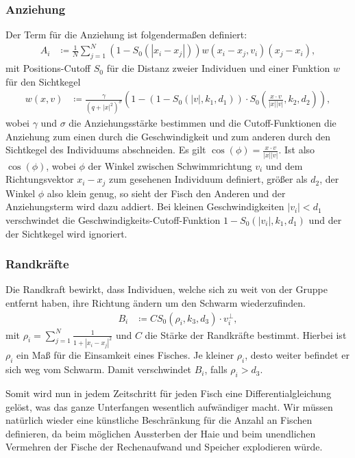 \documentclass[a4paper,11pt]{article}
\theoremstyle{definition}
\numberwithin{equation}{section}
\begin{document}
	\subsubsection{Anziehung}
	Der Term für die Anziehung ist folgendermaßen definiert:
	\begin{align*}
		A_i &\coloneqq \frac{1}{N}\sum^N_{j = 1} (1-S_0(|x_i - x_j|))w(x_i - x_j, v_i)(x_j - x_i), 
	\end{align*}
	mit Positions-Cutoff $S_0$ für die Distanz zweier Individuen und einer Funktion $w$ für den Sichtkegel
	\begin{align*}
		w(x,v) &\coloneqq \frac{\gamma}{(q+|x|^2)^{\sigma}}\left(1-(1-S_0(|v|, k_1, d_1))\cdot S_0(\frac{x\cdot v}{|x||v|}, k_2, d_2)\right),
	\end{align*}
	wobei $\gamma$ und $\sigma$ die Anziehungsstärke bestimmen und die Cutoff-Funktionen die Anziehung zum einen durch die Geschwindigkeit und zum anderen durch den Sichtkegel des Individuums abschneiden.
	Es gilt $\cos(\phi) = \frac{x\cdot v}{|x||v|}$. Ist also $\cos(\phi)$, wobei $\phi$ der Winkel zwischen Schwimmrichtung $v_i$ und dem Richtungsvektor $x_i - x_j$ zum gesehenen Individuum definiert, größer als $d_2$, der Winkel $\phi$ also klein genug, so sieht der Fisch den Anderen und der Anziehungsterm wird dazu addiert. Bei kleinen Geschwindigkeiten $|v_i| < d_1$ verschwindet die Geschwindigkeits-Cutoff-Funktion $1-S_0(|v_i|, k_1, d_1)$ und der der Sichtkegel wird ignoriert.
	
	\subsubsection{Randkräfte}
	Die Randkraft bewirkt, dass Individuen, welche sich zu weit von der Gruppe entfernt haben, ihre Richtung ändern um den Schwarm wiederzufinden.
	\begin{align*}
		B_i &\coloneqq CS_0(\rho_i, k_3, d_3)\cdot v_i^\perp, 
	\end{align*}
	mit $\rho_i = \sum^N_{j = 1} \frac{1}{1+|x_i-x_j|^2}$ und $C$ die Stärke der Randkräfte bestimmt.
	Hierbei ist $\rho_i$ ein Maß für die Einsamkeit eines Fisches. Je kleiner $\rho_i$, desto weiter befindet er sich weg vom Schwarm.
	Damit verschwindet $B_i$, falls $\rho_i > d_3$.\newline
	
	Somit wird nun in jedem Zeitschritt für jeden Fisch eine Differentialgleichung gelöst, was das ganze Unterfangen wesentlich aufwändiger macht. Wir müssen natürlich wieder eine künstliche Beschränkung für die Anzahl an Fischen definieren, da beim möglichen Aussterben der Haie und beim unendlichen Vermehren der Fische der Rechenaufwand und Speicher explodieren würde. \newline
	
\end{document}
